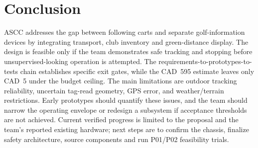 \section{Conclusion}
ASCC addresses the gap between following carts and separate golf-information devices by integrating transport, club inventory and green-distance display. The design is feasible only if the team demonstrates safe tracking and stopping before unsupervised-looking operation is attempted. The requirements-to-prototypes-to-tests chain establishes specific exit gates, while the CAD~595 estimate leaves only CAD~5 under the budget ceiling. The main limitations are outdoor tracking reliability, uncertain tag-read geometry, GPS error, and weather/terrain restrictions. Early prototypes should quantify these issues, and the team should narrow the operating envelope or redesign a subsystem if acceptance thresholds are not achieved. Current verified progress is limited to the proposal and the team's reported existing hardware; next steps are to confirm the chassis, finalize safety architecture, source components and run P01/P02 feasibility trials.\par
